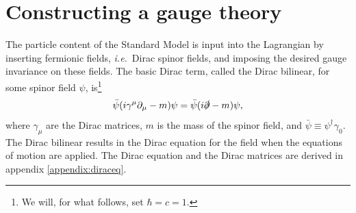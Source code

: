 \documentclass[twoside,english]{uiofysmaster}
\begin{document}
\section{Constructing a gauge theory}
The particle content of the Standard Model is input into the Lagrangian by inserting fermionic fields, {\it i.e.}\ Dirac spinor fields, and imposing the desired gauge invariance on these fields. The basic Dirac term, called the Dirac bilinear, for some spinor field $\psi$, is\footnote{We will, for what follows, set $\hbar = c = 1$.} 
\begin{align}
	\bar \psi (i\gamma^\mu \partial_\mu - m) \psi = \bar \psi (i\slashed\partial - m)\psi, \label{eq:diracbilinear}
\end{align}
where $\gamma_\mu$ are the Dirac matrices, $m$ is the mass of the spinor field, and $\bar\psi \equiv \psi^\dag \gamma_0$. The Dirac bilinear results in the Dirac equation for the field when the equations of motion are applied. The Dirac equation and the Dirac matrices are derived in appendix \ref{appendix:diraceq}.
\end{document}
